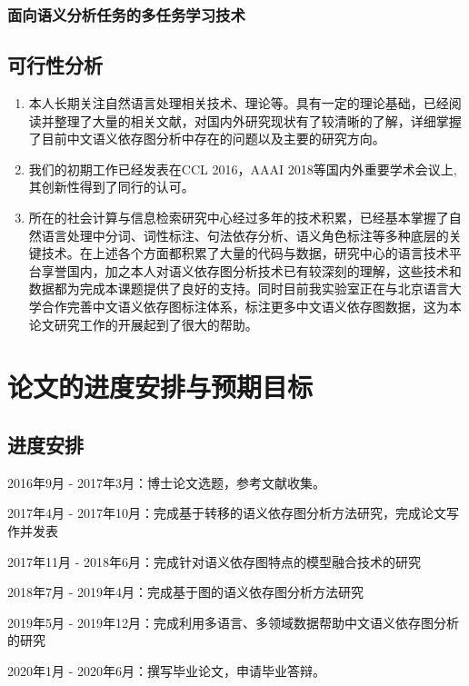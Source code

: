 \subsubsection{面向语义分析任务的多任务学习技术}


\subsection{可行性分析}
\begin{enumerate}
	\item 本人长期关注自然语言处理相关技术、理论等。具有一定的理论基础，已经阅读并整理了大量的相关文献，对国内外研究现状有了较清晰的了解，详细掌握了目前中文语义依存图分析中存在的问题以及主要的研究方向。
	
	\item 我们的初期工作已经发表在CCL 2016，AAAI 2018等国内外重要学术会议上,其创新性得到了同行的认可。
	
	\item 所在的社会计算与信息检索研究中心经过多年的技术积累，已经基本掌握了自然语言处理中分词、词性标注、句法依存分析、语义角色标注等多种底层的关键技术。在上述各个方面都积累了大量的代码与数据，研究中心的语言技术平台享誉国内，加之本人对语义依存图分析技术已有较深刻的理解，这些技术和数据都为完成本课题提供了良好的支持。同时目前我实验室正在与北京语言大学合作完善中文语义依存图标注体系，标注更多中文语义依存图数据，这为本论文研究工作的开展起到了很大的帮助。
	
	
\end{enumerate}
\section{论文的进度安排与预期目标}

\subsection{进度安排}

2016年9月 - 2017年3月：博士论文选题，参考文献收集。

2017年4月 - 2017年10月：完成基于转移的语义依存图分析方法研究，完成论文写作并发表

2017年11月 - 2018年6月：完成针对语义依存图特点的模型融合技术的研究

2018年7月 - 2019年4月：完成基于图的语义依存图分析方法研究

2019年5月 - 2019年12月：完成利用多语言、多领域数据帮助中文语义依存图分析的研究

2020年1月 - 2020年6月：撰写毕业论文，申请毕业答辩。


